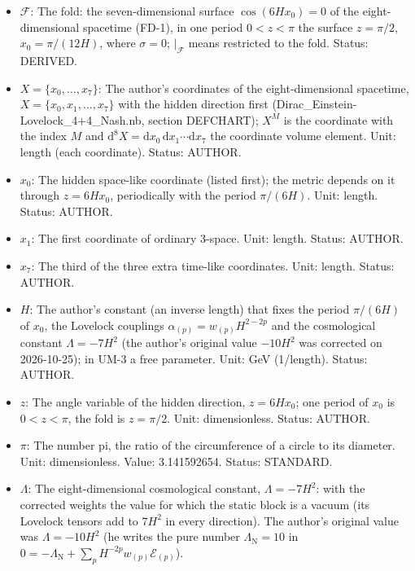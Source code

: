 \documentclass[
  10pt,
]{article}
\providecommand{\tightlist}{%
  \setlength{\itemsep}{0pt}\setlength{\parskip}{0pt}}
\begin{document}
\begin{itemize}
\tightlist
\item
  \(\mathcal{F}\): The fold: the seven-dimensional surface
  \(\cos(6Hx_0) = 0\) of the eight-dimensional spacetime (FD-1), in one
  period \(0 < z < \pi\) the surface \(z = \pi/2\), \(x_0 = \pi/(12H)\),
  where \(\sigma = 0\); \(\vert_{\mathcal{F}}\) means restricted to the
  fold. Status: DERIVED.
\item
  \(X = \{x_0, \dots, x_7\}\): The author's coordinates of the
  eight-dimensional spacetime, \(X = \{x_0, x_1, \dots, x_7\}\) with the
  hidden direction first (Dirac\_Einstein-Lovelock\_4+4\_Nash.nb,
  section DEFCHART); \(X^M\) is the coordinate with the index \(M\) and
  \(\mathrm{d}^8X = \mathrm{d}x_0\,\mathrm{d}x_1\cdots\mathrm{d}x_7\)
  the coordinate volume element. Unit: length (each coordinate). Status:
  AUTHOR.
\item
  \(x_0\): The hidden space-like coordinate (listed first); the metric
  depends on it through \(z = 6Hx_0\), periodically with the period
  \(\pi/(6H)\). Unit: length. Status: AUTHOR.
\item
  \(x_1\): The first coordinate of ordinary 3-space. Unit: length.
  Status: AUTHOR.
\item
  \(x_7\): The third of the three extra time-like coordinates. Unit:
  length. Status: AUTHOR.
\item
  \(H\): The author's constant (an inverse length) that fixes the period
  \(\pi/(6H)\) of \(x_0\), the Lovelock couplings
  \(\alpha_{(p)} = w_{(p)}H^{2-2p}\) and the cosmological constant
  \(\Lambda = -7H^2\) (the author's original value \(-10H^2\) was
  corrected on 2026-10-25); in UM-3 a free parameter. Unit: GeV
  (1/length). Status: AUTHOR.
\item
  \(z\): The angle variable of the hidden direction, \(z = 6Hx_0\); one
  period of \(x_0\) is \(0 < z < \pi\), the fold is \(z = \pi/2\). Unit:
  dimensionless. Status: AUTHOR.
\item
  \(\pi\): The number pi, the ratio of the circumference of a circle to
  its diameter. Unit: dimensionless. Value: 3.141592654. Status:
  STANDARD.
\item
  \(\Lambda\): The eight-dimensional cosmological constant,
  \(\Lambda = -7H^2\): with the corrected weights the value for which
  the static block is a vacuum (its Lovelock tensors add to \(7H^2\) in
  every direction). The author's original value was \(\Lambda = -10H^2\)
  (he writes the pure number \(\Lambda_{\mathrm{N}} = 10\) in
  \(0 = -\Lambda_{\mathrm{N}} + \sum_p H^{-2p}w_{(p)}\mathcal{E}_{(p)}\)).

\end{itemize}
\end{document}
